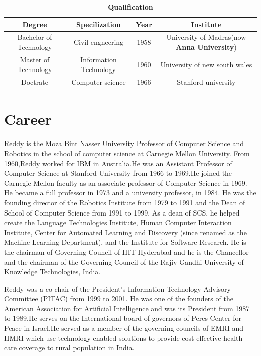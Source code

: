 \documentclass[a4paper,10pt]{article}
\begin{document}
\begin{table}[!hbt]
 \centering
 \caption{\bf Qualification}
  \begin{tabular}{|c|c|c|c|}
    \hline
    {\bf Degree} & {\bf Specilization} & {\bf Year} & {\bf Institute}\\
    \hline
    Bachelor of Technology & Civil engneering & 1958 & 
    \begin{minipage}{0.295\textwidth} 
      University of Madras(now {\bf Anna University})
    \end{minipage}\\
    \hline
    Master of Technology & Information Technology & 1960 & University of new south wales\\
    \hline
    Doctrate & Computer science & 1966 & Stanford university\\
    \hline
  \end{tabular}
\end{table}

\section{Career}
\paragraph{}
  Reddy is the Moza Bint Nasser University Professor of Computer Science and
  Robotics in the school of computer science at Carnegie Mellon University.
  From 1960,Reddy worked for IBM in Australia.He was an Assistant Professor
  of Computer Science at Stanford University from 1966 to 1969.He joined 
  the Carnegie Mellon faculty as an associate professor of Computer Science in
  1969. He became a full professor in 1973 and a university professor, in 1984.
  He was the founding director of the Robotics Institute from 1979 to 1991 
  and the Dean of School of Computer Science from 1991 to 1999. As a dean of 
  SCS, he helped create the Language Technologies Institute, Human Computer 
  Interaction Institute, Center for Automated Learning and Discovery (since 
  renamed as the Machine Learning Department), and the Institute for Software
  Research. He is the chairman of Governing Council of IIIT Hyderabad and he 
  is the Chancellor and the chairman of the Governing Council of the Rajiv 
  Gandhi University of Knowledge Technologies, India.
  
  Reddy was a co-chair of the President's Information Technology Advisory 
  Committee (PITAC) from 1999 to 2001. He was one of the founders of the 
  American Association for Artificial Intelligence and was its President
  from 1987 to 1989.He serves on the International board of governors of 
  Peres Center for Peace in Israel.He served as a member of the governing 
  councils of EMRI and HMRI which use technology-enabled solutions to provide
  cost-effective health care coverage to rural population in India.
  
\end{document}
